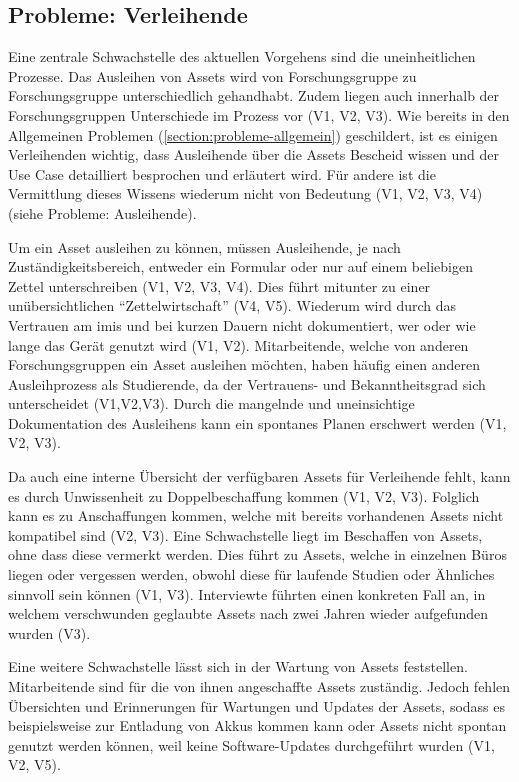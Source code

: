 \subsection{Probleme: Verleihende}
\label{section:probleme-verleihende}
Eine zentrale Schwachstelle des aktuellen Vorgehens sind die uneinheitlichen Prozesse. Das Ausleihen
von Assets wird von Forschungsgruppe zu Forschungsgruppe unterschiedlich gehandhabt. Zudem liegen
auch innerhalb der Forschungsgruppen Unterschiede im Prozess vor (V1, V2, V3). Wie bereits in den
Allgemeinen Problemen (\ref{section:probleme-allgemein}) geschildert, ist es einigen Verleihenden
wichtig, dass Ausleihende über die Assets Bescheid wissen und der Use Case detailliert besprochen
und erläutert wird. Für andere ist die Vermittlung dieses Wissens wiederum nicht von Bedeutung
(V1, V2, V3, V4) (siehe Probleme: Ausleihende).

Um ein Asset ausleihen zu können, müssen Ausleihende, je nach Zuständigkeitsbereich, entweder ein
Formular oder nur auf einem beliebigen Zettel unterschreiben (V1, V2, V3, V4). Dies führt mitunter
zu einer unübersichtlichen \enquote{Zettelwirtschaft} (V4, V5). Wiederum wird durch das Vertrauen am
\ac{imis} und bei kurzen Dauern nicht dokumentiert, wer oder wie lange das Gerät genutzt wird (V1,
V2). Mitarbeitende, welche von anderen Forschungsgruppen ein Asset ausleihen möchten, haben häufig
einen anderen Ausleihprozess als Studierende, da der Vertrauens- und Bekanntheitsgrad sich
unterscheidet (V1,V2,V3). Durch die mangelnde und uneinsichtige Dokumentation des Ausleihens kann
ein spontanes Planen erschwert werden (V1, V2, V3).

Da auch eine interne Übersicht der verfügbaren Assets für Verleihende fehlt, kann es durch
Unwissenheit zu Doppelbeschaffung kommen (V1, V2, V3). Folglich kann es zu Anschaffungen kommen,
welche mit bereits vorhandenen Assets nicht kompatibel sind (V2, V3). Eine Schwachstelle liegt im
Beschaffen von Assets, ohne dass diese vermerkt werden. Dies führt zu Assets, welche in einzelnen
Büros liegen oder vergessen werden, obwohl diese für laufende Studien oder Ähnliches sinnvoll sein
können (V1, V3). Interviewte führten einen konkreten Fall an, in welchem verschwunden geglaubte
Assets nach zwei Jahren wieder aufgefunden wurden (V3).

Eine weitere Schwachstelle lässt sich in der Wartung von Assets feststellen. Mitarbeitende sind für
die von ihnen angeschaffte Assets zuständig. Jedoch fehlen Übersichten und Erinnerungen für
Wartungen und Updates der Assets, sodass es beispielsweise zur Entladung von Akkus kommen kann oder
Assets nicht spontan genutzt werden können, weil keine Software-Updates durchgeführt wurden (V1, V2,
V5).

